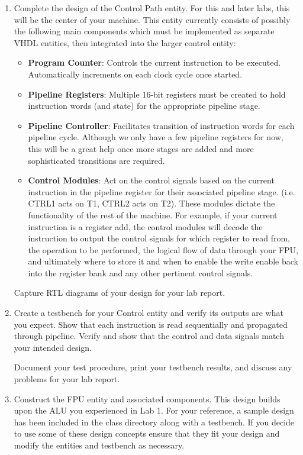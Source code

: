 \documentclass{article}
\begin{document}
\begin{enumerate}
  \item Complete the design of the Control Path entity. For this and later labs, this will be the center of your machine. This entity currently consists of possibly the following main components which must be implemented as separate VHDL entities, then integrated into the larger control entity:
  \begin{itemize}
    \item \textbf{Program Counter}: Controls the current instruction to be executed. Automatically increments on each clock cycle once started.
    \item \textbf{Pipeline Registers}: Multiple 16-bit registers must be created to hold instruction words (and state) for the appropriate pipeline stage.
    \item \textbf{Pipeline Controller}: Facilitates transition of instruction words for each pipeline cycle. Although we only have a few pipeline registers for now, this will be a great help once more stages are added and more sophisticated transitions are required.
    \item \textbf{Control Modules}: Act on the control signals based on the current instruction in the pipeline register for their associated pipeline stage. (i.e. CTRL1 acts on T1, CTRL2 acts on T2). These modules dictate the functionality of the rest of the machine. For example, if your current instruction is a register add, the control modules will decode the instruction to output the control signals for which register to read from, the operation to be performed, the logical flow of data through your FPU, and ultimately where to store it and when to enable the write enable back into the register bank and any other pertinent control signals.
  \end{itemize}
  Capture RTL diagrams of your design for your lab report.

  \item Create a testbench for your Control entity and verify its outputs are what you expect. Show that each instruction is read sequentially and propagated through pipeline. Verify and show that the control and data signals match your intended design.
  
  Document your test procedure, print your testbench results, and discuss any problems for your lab report.

  \item Construct the FPU entity and associated components. This design builds upon the ALU you experienced in Lab 1. For your reference, a sample design has been included in the class directory along with a testbench. If you decide to use some of these design concepts ensure that they fit your design and modify the entities and testbench as necessary.
  

\end{enumerate}
\end{document}
